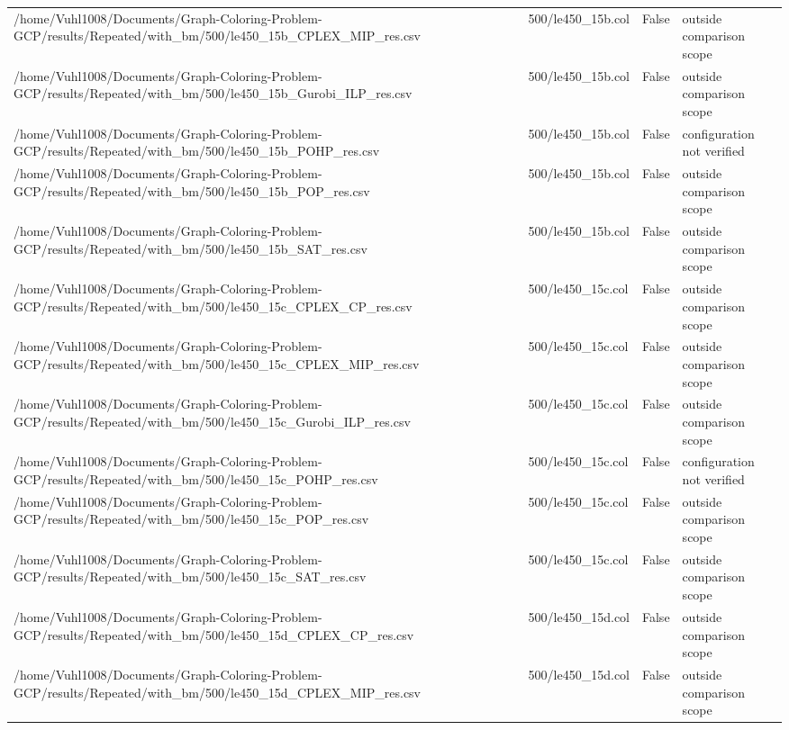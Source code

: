 \begin{table}[htbp]
\begin{tabular}{llll}
/home/Vuhl1008/Documents/Graph-Coloring-Problem-GCP/results/Repeated/with\_bm/500/le450\_15b\_CPLEX\_MIP\_res.csv & 500/le450\_15b.col & False & outside comparison scope \\
/home/Vuhl1008/Documents/Graph-Coloring-Problem-GCP/results/Repeated/with\_bm/500/le450\_15b\_Gurobi\_ILP\_res.csv & 500/le450\_15b.col & False & outside comparison scope \\
/home/Vuhl1008/Documents/Graph-Coloring-Problem-GCP/results/Repeated/with\_bm/500/le450\_15b\_POHP\_res.csv & 500/le450\_15b.col & False & configuration not verified \\
/home/Vuhl1008/Documents/Graph-Coloring-Problem-GCP/results/Repeated/with\_bm/500/le450\_15b\_POP\_res.csv & 500/le450\_15b.col & False & outside comparison scope \\
/home/Vuhl1008/Documents/Graph-Coloring-Problem-GCP/results/Repeated/with\_bm/500/le450\_15b\_SAT\_res.csv & 500/le450\_15b.col & False & outside comparison scope \\
/home/Vuhl1008/Documents/Graph-Coloring-Problem-GCP/results/Repeated/with\_bm/500/le450\_15c\_CPLEX\_CP\_res.csv & 500/le450\_15c.col & False & outside comparison scope \\
/home/Vuhl1008/Documents/Graph-Coloring-Problem-GCP/results/Repeated/with\_bm/500/le450\_15c\_CPLEX\_MIP\_res.csv & 500/le450\_15c.col & False & outside comparison scope \\
/home/Vuhl1008/Documents/Graph-Coloring-Problem-GCP/results/Repeated/with\_bm/500/le450\_15c\_Gurobi\_ILP\_res.csv & 500/le450\_15c.col & False & outside comparison scope \\
/home/Vuhl1008/Documents/Graph-Coloring-Problem-GCP/results/Repeated/with\_bm/500/le450\_15c\_POHP\_res.csv & 500/le450\_15c.col & False & configuration not verified \\
/home/Vuhl1008/Documents/Graph-Coloring-Problem-GCP/results/Repeated/with\_bm/500/le450\_15c\_POP\_res.csv & 500/le450\_15c.col & False & outside comparison scope \\
/home/Vuhl1008/Documents/Graph-Coloring-Problem-GCP/results/Repeated/with\_bm/500/le450\_15c\_SAT\_res.csv & 500/le450\_15c.col & False & outside comparison scope \\
/home/Vuhl1008/Documents/Graph-Coloring-Problem-GCP/results/Repeated/with\_bm/500/le450\_15d\_CPLEX\_CP\_res.csv & 500/le450\_15d.col & False & outside comparison scope \\
/home/Vuhl1008/Documents/Graph-Coloring-Problem-GCP/results/Repeated/with\_bm/500/le450\_15d\_CPLEX\_MIP\_res.csv & 500/le450\_15d.col & False & outside comparison scope \\

\end{tabular}
\end{table}
